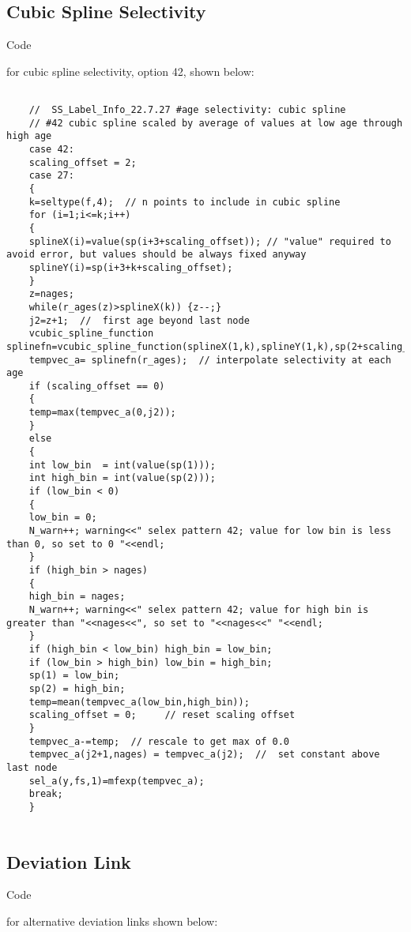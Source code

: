 {\pagebreak
\subsection{Cubic Spline Selectivity}
\hypertarget{CubicSpline}{Code} for cubic spline selectivity, option 42, shown below:

\scriptsize
\begin{verbatim}
	
	//  SS_Label_Info_22.7.27 #age selectivity: cubic spline
	// #42 cubic spline scaled by average of values at low age through high age
	case 42:
	scaling_offset = 2;
	case 27:
	{
	k=seltype(f,4);  // n points to include in cubic spline
	for (i=1;i<=k;i++)
	{
	splineX(i)=value(sp(i+3+scaling_offset)); // "value" required to avoid error, but values should be always fixed anyway
	splineY(i)=sp(i+3+k+scaling_offset);
	}
	z=nages;
	while(r_ages(z)>splineX(k)) {z--;}
	j2=z+1;  //  first age beyond last node
	vcubic_spline_function splinefn=vcubic_spline_function(splineX(1,k),splineY(1,k),sp(2+scaling_offset),sp(3+scaling_offset));
	tempvec_a= splinefn(r_ages);  // interpolate selectivity at each age
	if (scaling_offset == 0)
	{
	temp=max(tempvec_a(0,j2));
	}
	else
	{
	int low_bin  = int(value(sp(1)));
	int high_bin = int(value(sp(2)));
	if (low_bin < 0)
	{
	low_bin = 0;
	N_warn++; warning<<" selex pattern 42; value for low bin is less than 0, so set to 0 "<<endl;
	}
	if (high_bin > nages)
	{
	high_bin = nages;
	N_warn++; warning<<" selex pattern 42; value for high bin is greater than "<<nages<<", so set to "<<nages<<" "<<endl;
	}
	if (high_bin < low_bin) high_bin = low_bin;
	if (low_bin > high_bin) low_bin = high_bin;
	sp(1) = low_bin;
	sp(2) = high_bin;
	temp=mean(tempvec_a(low_bin,high_bin));
	scaling_offset = 0;     // reset scaling offset
	}
	tempvec_a-=temp;  // rescale to get max of 0.0
	tempvec_a(j2+1,nages) = tempvec_a(j2);  //  set constant above last node
	sel_a(y,fs,1)=mfexp(tempvec_a);
	break;
	}
	
\end{verbatim}

\pagebreak
\subsection{Deviation Link}
\hypertarget{DevLink}{Code} for alternative deviation links shown below:

\scriptsize
\begin{verbatim}


\end{verbatim}}
